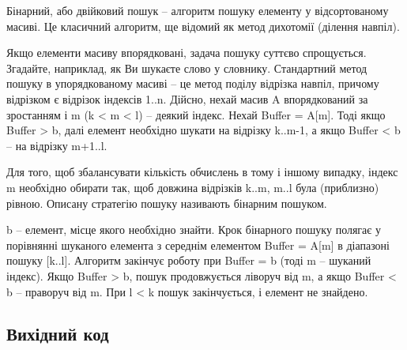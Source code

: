 \documentclass[12pt]{extarticle}
\begin{document}
Бінарний, або двійковий пошук – алгоритм пошуку елементу у відсортованому масиві. Це класичний алгоритм, ще відомий як метод дихотомії (ділення навпіл).

Якщо елементи масиву впорядковані, задача пошуку суттєво спрощується. Згадайте, наприклад, як Ви шукаєте слово у словнику. Стандартний метод пошуку в упорядкованому масиві – це метод поділу відрізка навпіл, причому відрізком є відрізок індексів 1..n. Дійсно, нехай масив A впорядкований за зростанням і m (k < m < l) – деякий індекс. Нехай Buffer = A[m]. Тоді якщо Buffer > b, далі елемент необхідно шукати на відрізку k..m-1, а якщо Buffer < b – на відрізку m+1..l.

Для того, щоб збалансувати кількість обчислень в тому і іншому випадку, індекс m необхідно обирати так, щоб довжина відрізків k..m, m..l була (приблизно) рівною. Описану стратегію пошуку називають бінарним пошуком.

b – елемент, місце якого необхідно знайти. Крок бінарного пошуку полягає у порівнянні шуканого елемента з середнім елементом Buffer = A[m] в діапазоні пошуку [k..l]. Алгоритм закінчує роботу при Buffer = b (тоді m – шуканий індекс). Якщо Buffer > b, пошук продовжується ліворуч від m, а якщо Buffer < b – праворуч від m. При l < k пошук закінчується, і елемент не знайдено.
\subsection*{Вихідний код}
\end{document}
